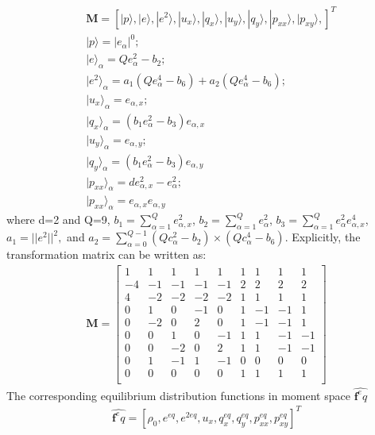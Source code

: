 \begin{align}
 & \mathbf{M}=\left[|p\rangle,|e\rangle,|e^2\rangle,|u_x\rangle,|q_x\rangle,|u_y\rangle,|q_y\rangle,|p_{xx}\rangle,|p_{xy}\rangle,\right]^T \\
 & |p\rangle = |\textit{e}_{\alpha}|^0;\\
 & |e\rangle_{\alpha}=\textit{Q}e_{\alpha}^2-b_2;\\
 & |e^2\rangle_{\alpha}=a_1(\textit{Q}e_{\alpha}^4-b_6)+a_2(\textit{Q}e_{\alpha}^4-b_6);\\
 & |u_x\rangle_{\alpha}=e_{\alpha,x}; \\
 & |q_x\rangle_{\alpha}=(\textit{b}_1e_{\alpha}^2-b_3)e_{\alpha,x}\\
 & |u_y\rangle_{\alpha}=e_{\alpha,y}; \\
 & |q_y\rangle_{\alpha}=(\textit{b}_1e_{\alpha}^2-b_3)e_{\alpha,y}\\
 & |p_{xx}\rangle_{\alpha}=\textit{d}e_{\alpha,x}^2-e_{\alpha}^2; \\
 & |p_{xx}\rangle_{\alpha}=e_{\alpha,x}e_{\alpha,y}
\end{align}
\flushleft where d=2 and Q=9, $b_1=\sum_{\alpha=1}^{Q}e_{\alpha,x}^2$, $b_2=\sum_{\alpha=1}^{Q}e_{\alpha}^2$, 
$b_3=\sum_{\alpha=1}^{Q}e_{\alpha}^2e_{\alpha,x}^4$, $a_1=||e^2||^2,$ and $a_2=\sum_{\alpha=0}^{Q-1}(Qc_{\alpha}^2-b_2)\times(Qc_{\alpha}^4-b_6)$. Explicitly, the transformation matrix can be written as:
\begin{align}
\mathbf{M}= \begin{bmatrix}
 1 &  1 &  1 &  1 &  1 &  1 &  1 &  1 &  1 \\
-4 & -1 & -1 & -1 & -1 &  2 &  2 &  2 &  2 \\ 
 4 & -2 & -2 & -2 & -2 &  1 &  1 &  1 &  1 \\
 0 &  1 &  0 & -1 &  0 &  1 & -1 & -1 &  1 \\
 0 & -2 &  0 &  2 &  0 &  1 & -1 & -1 &  1 \\
 0 &  0 &  1 &  0 & -1 &  1 &  1 & -1 & -1 \\
 0 &  0 & -2 &  0 &  2 &  1 &  1 & -1 & -1 \\
 0 &  1 & -1 &  1 & -1 &  0 &  0 &  0 &  0 \\
 0 &  0 &  0 &  0 &  0 &  1 &  1 &  1 &  1 \\
\end{bmatrix}
\end{align}
The corresponding equilibrium distribution functions in moment space $\widehat{\mathbf{f}^eq}$
\begin{align}
\widehat{\mathbf{f}^eq}=\left[\rho_0,e^{eq},e^{2eq},u_x,q_x^{eq},q_y^{eq},p_{xx}^{eq},p_{xy}^{eq}\right]^T
\end{align}
